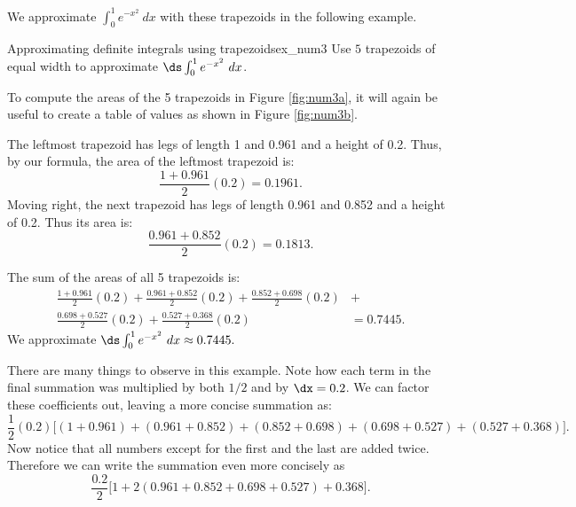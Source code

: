  We approximate $\int_0^1 e^{-x^2}\ dx$ with these trapezoids in the following example.\\



\begin{example}{Approximating definite integrals using trapezoids}{ex_num3}
{
Use $ 5 $ trapezoids of equal width to approximate $\ds \int_0^1e^{-x^2}\ dx$.}
\end{example}

\begin{solution}
{To compute the areas of the 5 trapezoids in Figure \ref{fig:num3a}, it will again be useful to create a table of values as shown in Figure \ref{fig:num3b}.




The leftmost trapezoid has legs of length 1 and 0.961 and a height of 0.2. Thus, by our formula, the area of the leftmost trapezoid is: $$ \frac{1+0.961}{2}(0.2) = 0.1961.$$
Moving right, the next trapezoid has legs of length 0.961 and 0.852 and a height of 0.2. Thus its area is: $$\frac{0.961+0.852}2(0.2) = 0.1813.$$

The sum of the areas of all 5 trapezoids is:
\begin{align*}
\frac{1+0.961}{2}(0.2) + \frac{0.961+0.852}2(0.2)+\frac{0.852+0.698}2(0.2)&+ \\
\frac{0.698+0.527}2(0.2)+\frac{0.527+0.368}2(0.2)&= 0.7445.
\end{align*}
We approximate $\ds \int_0^1 e^{-x^2}\ dx \approx 0.7445.$
}
\end{solution}




%
There are many things to observe in this example. Note how each term in the final summation was multiplied by both $ 1/2 $ and by $\dx = 0.2$. We can factor these coefficients out, leaving a more concise summation as:\small
$$
\frac12(0.2)\Big[(1+0.961) + (0.961+0.852) + (0.852+0.698) + ( 0.698+ 0.527) +(0.527 + 0.368)\Big].$$
\normalsize
Now notice that all numbers except for the first and the last are added twice. Therefore we can write the summation even more concisely as
$$\frac{0.2}{2}\Big[1 + 2(0.961+0.852+0.698+0.527) + 0.368\Big].$$

